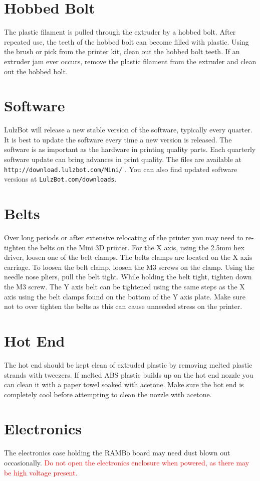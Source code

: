\section{Hobbed Bolt}
The plastic filament is pulled through the extruder by a hobbed bolt. After repeated use, the teeth of the hobbed bolt can become filled with plastic. Using the brush or pick from the printer kit, clean out the hobbed bolt teeth. If an extruder jam ever occurs, remove the plastic filament from the extruder and clean out the hobbed bolt.

\section{Software}
LulzBot will release a new stable version of the software, typically every quarter. It is best to update the software every time a new version is released. The software is as important as the hardware in printing quality parts. Each quarterly software update can bring advances in print quality. The files are available at \texttt{http://download.lulzbot.com/Mini/} . You can also find updated software versions at \texttt{LulzBot.com/downloads}.

\section{Belts}
Over long periods or after extensive relocating of the printer you may need to re-tighten the belts on the Mini 3D printer. For the X axis, using the 2.5mm hex driver, loosen one of the belt clamps. The belts clamps are located on the X axis carriage. To loosen the belt clamp, loosen the M3 screws on the clamp. Using the needle nose pliers, pull the belt tight. While holding the belt tight, tighten down the M3 screw. The Y axis belt can be tightened using the same steps as the X axis using the belt clamps found on the bottom of the Y axis plate. Make sure not to over tighten the belts as this can cause unneeded stress on the printer.

\section{Hot End}
The hot end should be kept clean of extruded plastic by removing melted plastic strands with tweezers. If melted ABS plastic builds up on the hot end nozzle you can clean it with a paper towel soaked with acetone. Make sure the hot end is completely cool before attempting to clean the nozzle with acetone.


\section{Electronics}
The electronics case holding the RAMBo board may need dust blown out occasionally. \textcolor{red}{Do not open the electronics enclosure when powered, as there may be high voltage present.}
